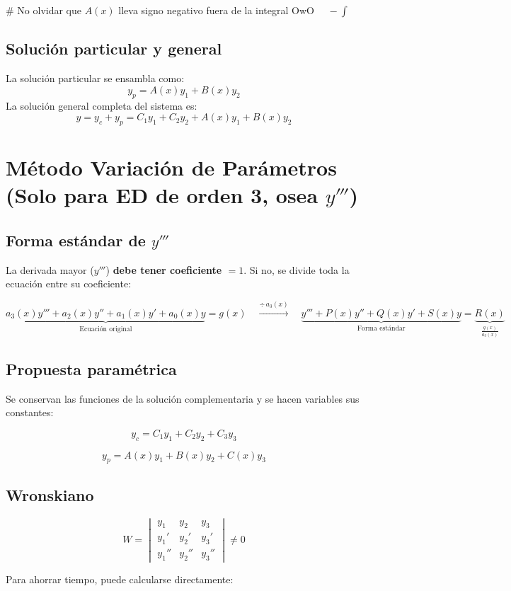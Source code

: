 \documentclass[10pt,letterpaper]{article}
\begin{document}
	\# No olvidar que $A(x)$ lleva signo negativo fuera de la integral OwO $\quad -\int$
	
	
	\subsection*{Solución particular y general}
	La solución particular se ensambla como:
	\[
	y_p = A(x) y_1 + B(x) y_2
	\]
	La solución general completa del sistema es:
	\[
	y = y_c + y_p = C_1 y_1 + C_2 y_2 + A(x) y_1 + B(x) y_2
	\]
	
	\newpage
	
	\section*{Método Variación de Parámetros (Solo para ED de orden 3, osea $y'''$)}
	
	\subsection*{Forma estándar de $y'''$}
	La derivada mayor ($y'''$) \textbf{debe tener coeficiente $=1$}. Si no, se divide toda la ecuación entre su coeficiente:
	
	\[
	\underbrace{a_3(x)y'''+a_2(x)y''+a_1(x)y'+a_0(x)y}_{\text{Ecuación original}}
	=g(x)
	\quad\xrightarrow{\div\,a_3(x)}\quad
	\underbrace{y'''+P(x)y''+Q(x)y'+S(x)y}_{\text{Forma estándar}}
	=\underbrace{R(x)}_{\frac{g(x)}{a_3(x)}}
	\]
	
	\subsection*{Propuesta paramétrica}
	Se conservan las funciones de la solución complementaria y se hacen variables sus constantes:
	
	\[
	y_c=C_1y_1+C_2y_2+C_3y_3
	\]
	
	\[
	y_p=A(x)y_1+B(x)y_2+C(x)y_3
	\]
	
	\subsection*{Wronskiano}
	\[
	W=
	\begin{vmatrix}
		y_1&y_2&y_3\\
		y_1'&y_2'&y_3'\\
		y_1''&y_2''&y_3''
	\end{vmatrix}
	\neq0
	\]
	
	Para ahorrar tiempo, puede calcularse directamente:
	
\end{document}
